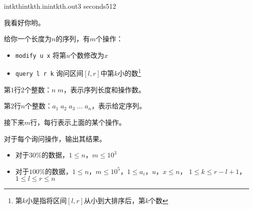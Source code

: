 \documentclass[11pt,a4paper,oneside]{article}
\begin{document}
\begin{problem}{intkth}{intkth.in}{intkth.out}{3 seconds}{512}
	
	我看好你哟。
	
	给你一个长度为$n$的序列，有$m$个操作：
	
	\begin{itemize}
		\item \texttt{modify u x} 将第$u$个数修改为$x$
		\item \texttt{query l r k} 询问区间$[l,r]$中第$k$小的数\footnote{第$k$小是指将区间$[l,r]$从小到大排序后，第$k$个数}
	\end{itemize}
	
	\InputFile

	第$1$行$2$个整数：$n \; m$，表示序列长度和操作数。
	
	第$2$行$n$个整数：$a_1 \; a_2 \; a_3 \; \dots \; a_n$，表示给定序列。
	
	接下来$m$行，每行表示上面的某个操作。

	\OutputFile
	
	对于每个询问操作，输出其结果。
	
	\Example
	
	\begin{example}
	\end{example}

	\Note
	\begin{itemize}
		\item 对于$30\%$的数据，$1 \leq n， m \leq 10^3$
		\item 对于$100\%$的数据，$1 \leq n， m \leq 10^5$，$1 \leq a_i， u， x \leq n$， $ 1 \leq k \leq r - l + 1$， $1 \leq l \leq r \leq n$ 
	\end{itemize}

\end{problem}
\end{document}
